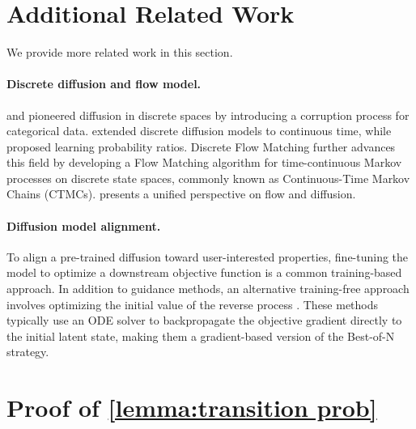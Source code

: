 




\section{Additional Related Work}\label{app:related work}
We provide more related work in this section.

\paragraph{Discrete diffusion and flow model.} \citet{austin2021structured} and \citet{hoogeboom2021argmax} pioneered diffusion in discrete spaces by introducing a corruption process for categorical data. \citet{campbell2022continuous} extended discrete diffusion models to continuous time, while \citet{loudiscrete} proposed learning probability ratios. Discrete Flow Matching \citet{campbell2024generative,gat2024discrete} further advances this field by developing a Flow Matching algorithm for time-continuous Markov processes on discrete state spaces, commonly known as Continuous-Time Markov Chains (CTMCs). \citet{lipman2024flow} presents a unified perspective on flow and diffusion.


\paragraph{Diffusion model alignment.} To align a pre-trained diffusion toward user-interested properties, fine-tuning the model to optimize a downstream objective function \citep{black2023training,uehara2024fine,prabhudesai2023aligning} is a common training-based approach. In addition to guidance methods, an alternative training-free approach involves optimizing the initial value of the reverse process \citep{wallace2023end, ben2024d,karunratanakul2024optimizing}. These methods typically use an ODE solver to backpropagate the objective gradient directly to the initial latent state, making them a gradient-based version of the Best-of-N strategy.




\section{Proof of \cref{lemma:transition prob}}\label{prof:transition prob}


